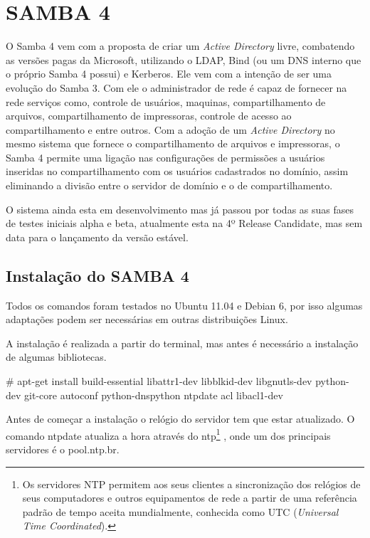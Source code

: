 \chapter{SAMBA 4}

O Samba 4 vem com a proposta de criar um \textit{Active Directory} livre, combatendo as versões pagas da Microsoft, utilizando o LDAP, Bind (ou um DNS interno que o próprio Samba 4 possui) e Kerberos. Ele vem com a intenção de ser uma evolução do Samba 3. Com ele o administrador de rede é capaz de fornecer na rede serviços como, controle de usuários, maquinas, compartilhamento de arquivos, compartilhamento de impressoras, controle de acesso ao compartilhamento e entre outros.
Com a adoção de um \textit{Active Directory} no mesmo sistema que fornece o compartilhamento de arquivos e impressoras, o Samba 4 permite uma ligação nas configurações de permissões a usuários inseridas no compartilhamento com os usuários cadastrados no domínio, assim eliminando a divisão entre o servidor de domínio e o de compartilhamento.

O sistema ainda esta em desenvolvimento mas já passou por todas as suas fases de testes iniciais alpha e beta, atualmente esta na 4º Release Candidate, mas sem data para o lançamento da versão estável.



\section{Instalação do SAMBA 4}

Todos os comandos foram testados no Ubuntu 11.04 e Debian 6, por isso algumas adaptações podem ser necessárias em outras distribuições Linux.

A instalação é realizada a partir do terminal, mas antes é necessário a instalação de algumas bibliotecas.

	\# apt-get install build-essential libattr1-dev libblkid-dev libgnutls-dev python-dev git-core autoconf python-dnspython ntpdate acl libacl1-dev

Antes de começar a instalação o relógio do servidor tem que estar atualizado. O comando ntpdate atualiza a hora através do  ntp\footnote[2]{Os servidores NTP permitem aos seus clientes a sincronização dos relógios de seus computadores e outros equipamentos de rede a partir de uma referência padrão de tempo aceita mundialmente, conhecida como UTC (\textit{Universal Time Coordinated}).\cite{RNP}} , onde um dos principais servidores é o pool.ntp.br.

